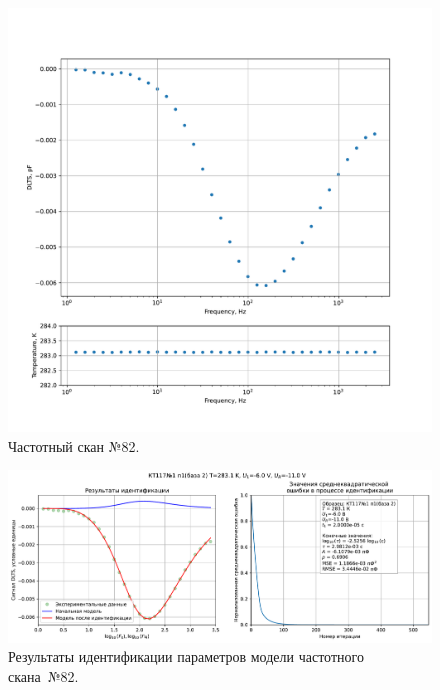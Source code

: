 \begin{figure}[!ht]
    \centering
    \includegraphics[width=1\textwidth]{../plots/КТ117№1_п1(база 2)_2500Гц-1Гц_1пФ_+10С_-6В-11В_100мВ_20мкс_шаг_0,1.pdf}
    \caption{Частотный скан №82.}
    \label{pic:frequency_scan_82}
\end{figure}

\begin{figure}[!ht]
    \centering
    \includegraphics[width=1\textwidth]{../plots/КТ117№1_п1(база 2)_2500Гц-1Гц_1пФ_+10С_-6В-11В_100мВ_20мкс_шаг_0,1_model.pdf}
    \caption{Результаты идентификации параметров модели частотного скана~№82.}
    \label{pic:frequency_scan_model82}
\end{figure}

\pagebreak


